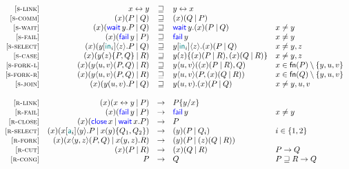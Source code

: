 \[
    \begin{array}{rrcll}
      \SLink &
      \Link\x\y & \pcong & \Link\y\x \\
      \SComm &
      \Cut\x{P}{Q} & \pcong & \Cut\x{Q}{P} \\
      \SWait &
      \Cut\x{\Wait\y.P}{Q} & \pcong & \Wait\y.\Cut\x{P}{Q} & x \ne y \\
      \SFail &
      \Cut\x{\Fail\y}{P} & \pcong & \Fail\y & x \ne y \\
      \SSelect &
      \Cut\x{\Select\y{\InTag_i}\z.P}{Q} & \pcong & \Select\y{\InTag_i}\z.\Cut\x{P}{Q} & x \ne y,z \\
      \SCase &
      \Cut\x{\Case\y\z{P}{Q}}{R} & \pcong & \Case\y\z{\Cut\x{P}{R}}{\Cut\x{Q}{R}} & x \ne y,z \\
      \SForkL &
      \Cut\x{\Fork\y\u\v{P}{Q}}{R} & \pcong & \Fork\y\u\v{\Cut\x{P}{R}}{Q} & x \in \fn{P}\setminus\set{y,u,v} \\
      \SForkR &
      \Cut\x{\Fork\y\u\v{P}{Q}}{R} & \pcong & \Fork\y\u\v{P}{\Cut\x{Q}{R}} & x \in \fn{Q}\setminus\set{y,u,v} \\
      \SJoin &
      \Cut\x{\Join\y\u\v.P}{Q} & \pcong & \Join\y\u\v.\Cut\x{P}{Q} & x \ne y,u,v \\
      \\
      \RLink &
      \Cut\x{\Link\x\y}{P} & \red & P\subst\y\x \\
      \RFail &
      \Cut\x{\Fail\y}{P} & \red & \Fail\y & x \ne y \\
      \RClose &
      \Cut\x{\Close\x}{\Wait\x.P} & \red & P \\
      \RSelect &
      \Cut\x{\Select\x{\Tag_i}\y.P}{\Case\x\y{Q_1}{Q_2}} & \red & \Cut\y{P}{Q_i} & i\in\set{1,2} \\
      \RFork &
      \Cut\x{\Fork\x\y\z{P}{Q}}{\Join\x\y\z.R} & \red & \Cut\y{P}{\Cut\z{Q}{R}} \\
      \RCut &
      \Cut\x{P}{R} & \red & \Cut\x{Q}{R} & P \red Q \\
      \RCong &
      P & \red & Q & P \pcong R \red Q \\
    \end{array}
\]

